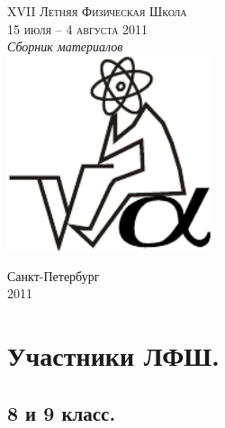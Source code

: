 \documentclass[11pt]{article}
\newlength{\h}
\newlength{\x}
\begin{document}
\thispagestyle{empty}
\parindent=5mm
\begin{center}

\phantom{Бухалкин апанас}

\vfill
\LARGE{\textsc{XVII Летняя Физическая Школа}}\\
\Large{\textsc{15 июля -- 4 августа 2011}}\\[1cm]
\Large{\textit{Сборник материалов}}\\[2cm]
\includegraphics[width=6cm]{logo.pdf}
\vfill

\small{\textsf{Санкт-Петербург}\\
\textsf{2011}}
\end{center}

\clearpage

\hypersetup{colorlinks,%
  linkcolor=black
}

\tableofcontents

\hypersetup{colorlinks,%
  citecolor=blue,
  urlcolor=blue,
  linkcolor=red
}


\clearpage

\section{Участники ЛФШ.}
\label{sec:participants}

\subsection{8 и 9 класс.}
\label{sec:8and9}
\end{document}
